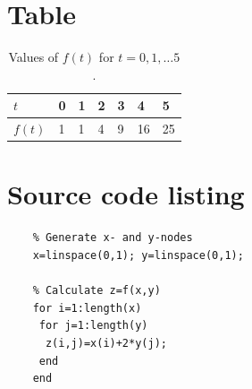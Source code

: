 \section{Table}
    \begin{table}[H]
        \centering
        \caption{Values of $f(t)$ for $t=0,1,\dots 5$.}
        \begin{tabular}{l|llllll} \hline\hline
            $t$ & 0 & 1 & 2 & 3 & 4 & 5 \\ \hline
            $f(t)$ & 1 & 1 & 4 & 9 & 16 & 25 \\ \hline\hline
        \end{tabular}
    \end{table}


\section{Source code listing}
\begin{verbatim}
    % Generate x- and y-nodes
    x=linspace(0,1); y=linspace(0,1);
    
    % Calculate z=f(x,y)
    for i=1:length(x)
     for j=1:length(y)
      z(i,j)=x(i)+2*y(j);
     end
    end
\end{verbatim}
